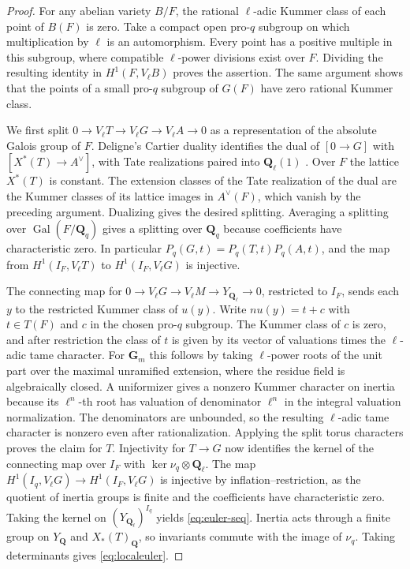 \documentclass[11pt]{amsart}
\numberwithin{equation}{section}
\theoremstyle{definition}
\theoremstyle{remark}
\newcommand{\Q}{\mathbf Q}
\newcommand{\Gm}{\mathbf G_m}
\newcommand{\Gal}{\operatorname{Gal}}
\begin{document}
\begin{proof}
For any abelian variety $B/F$, the rational $\ell$-adic Kummer
class of each point of $B(F)$ is zero. Take a compact open pro-$q$
subgroup on which multiplication by $\ell$ is an automorphism.
Every point has a positive multiple in this subgroup, where
compatible $\ell$-power divisions exist over $F$. Dividing the
resulting identity in $H^1(F,V_\ell B)$ proves the assertion.
The same argument shows that the points of a small pro-$q$
subgroup of $G(F)$ have zero rational Kummer class.

We first split $0\to V_\ell T\to V_\ell G\to V_\ell A\to0$
as a representation of the absolute Galois group of $F$.
Deligne's Cartier duality identifies the dual of $[0\to G]$
with $[X^*(T)\to A^\vee]$, with Tate realizations paired
into $\Q_\ell(1)$ \cite[\S10.2]{DeligneIII}. Over $F$ the
lattice $X^*(T)$ is constant. The extension classes of
the Tate realization of the dual are the Kummer classes
of its lattice images in $A^\vee(F)$, which vanish by the
preceding argument. Dualizing gives the desired splitting.
Averaging a splitting over $\Gal(F/\Q_q)$ gives a splitting
over $\Q_q$ because coefficients have characteristic zero.
In particular $P_q(G,t)=P_q(T,t)P_q(A,t)$, and the map from
$H^1(I_F,V_\ell T)$ to $H^1(I_F,V_\ell G)$ is injective.

The connecting map for $0\to V_\ell G\to V_\ell M
\to Y_{\Q_\ell}\to0$, restricted to $I_F$, sends each
$y$ to the restricted Kummer class of $u(y)$.
Write $nu(y)=t+c$ with $t\in T(F)$ and $c$ in the chosen
pro-$q$ subgroup. The Kummer class of $c$ is zero, and after
restriction the class of $t$ is given by its vector of
valuations times the $\ell$-adic tame character.
For $\Gm$ this follows by taking $\ell$-power roots of the unit
part over the maximal unramified extension, where the
residue field is algebraically closed. A uniformizer gives
a nonzero Kummer character on inertia because its $\ell^n$-th root
has valuation of denominator $\ell^n$ in the integral valuation
normalization. The denominators are unbounded, so the resulting
$\ell$-adic tame character is nonzero even after rationalization. Applying the split torus characters proves the claim
for $T$. Injectivity for $T\to G$ now identifies the kernel
of the connecting map over $I_F$ with
$\ker\nu_q\otimes\Q_\ell$. The map
$H^1(I_q,V_\ell G)\to H^1(I_F,V_\ell G)$ is injective by
inflation--restriction, as the quotient of inertia groups
is finite and the coefficients have characteristic zero.
Taking the kernel on $(Y_{\Q_\ell})^{I_q}$ yields
\eqref{eq:euler-seq}. Inertia acts through a finite group on
$Y_\Q$ and $X_*(T)_\Q$, so invariants commute with the image
of $\nu_q$. Taking determinants gives \eqref{eq:localeuler}.
\end{proof}
\end{document}
